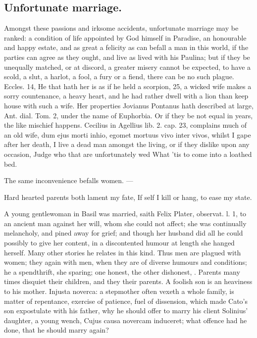 {\subsection{Unfortunate marriage.}
Amongst these passions and irksome accidents,
unfortunate marriage may be ranked: a condition of life appointed by
God himself in Paradise, an honourable and happy estate, and as great a
felicity as can befall a man in this world, if the parties can
agree as they ought, and live as \Seneca lived with his Paulina;
but if they be unequally matched, or at discord, a greater misery
cannot be expected, to have a scold, a slut, a harlot, a fool, a fury
or a fiend, there can be no such plague. Eccles.  14, He that hath
her is as if he held a scorpion, \etc{}  25, a wicked wife makes a
sorry countenance, a heavy heart, and he had rather dwell with a lion
than keep house with such a wife. Her properties Jovianus
Pontanus hath described at large, Ant. dial. Tom. 2, under the name of
Euphorbia. Or if they be not equal in years, the like mischief happens.
Cecilius in Agellius lib. 2. cap. 23, complains much of an old wife,
dum ejus morti inhio, egomet mortuus vivo inter vivos, whilst I gape
after her death, I live a dead man amongst the living, or if they
dislike upon any occasion,
Judge who that are unfortunately wed
What 'tis to come into a loathed bed.

The same inconvenience befalls women.
---

Hard hearted parents both lament my fate,
If self I kill or hang, to ease my state.

A young gentlewoman in Basil was married, saith Felix Plater,
observat. l. 1, to an ancient man against her will, whom she could not
affect; she was continually melancholy, and pined away for grief; and
though her husband did all he could possibly to give her content, in a
discontented humour at length she hanged herself. Many other stories he
relates in this kind. Thus men are plagued with women; they again with
men, when they are of diverse humours and conditions; he a spendthrift,
she sparing; one honest, the other dishonest, \etc{}. Parents many times
disquiet their children, and they their parents. A foolish son is
an heaviness to his mother. Injusta noverca: a stepmother often vexeth
a whole family, is matter of repentance, exercise of patience, fuel of
dissension, which made Cato's son expostulate with his father, why he
should offer to marry his client Solinius' daughter, a young wench,
Cujus causa novercam induceret; what offence had he done, that he
should marry again?

}
